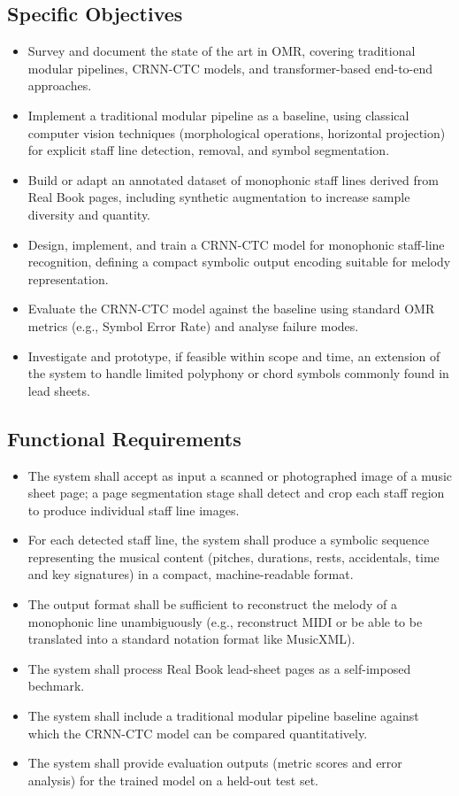 \documentclass[11pt, a4paper]{article}
\begin{document}
\subsection{Specific Objectives}
\begin{itemize}
    \item Survey and document the state of the art in OMR, covering traditional modular pipelines, CRNN-CTC models, and transformer-based end-to-end approaches.
    \item Implement a traditional modular pipeline as a baseline, using classical computer vision techniques (morphological operations, horizontal projection) for explicit staff line detection, removal, and symbol segmentation.
    \item Build or adapt an annotated dataset of monophonic staff lines derived from Real Book pages, including synthetic augmentation to increase sample diversity and quantity.
    \item Design, implement, and train a CRNN-CTC model for monophonic staff-line recognition, defining a compact symbolic output encoding suitable for melody representation.
    \item Evaluate the CRNN-CTC model against the baseline using standard OMR metrics (e.g., Symbol Error Rate) and analyse failure modes.
    \item Investigate and prototype, if feasible within scope and time, an extension of the system to handle limited polyphony or chord symbols commonly found in lead sheets.
\end{itemize}    

\subsection{Functional Requirements}
\begin{itemize}
    \item The system shall accept as input a scanned or photographed image of a music sheet page; a page segmentation stage shall detect and crop each staff region to produce individual staff line images.
    \item For each detected staff line, the system shall produce a symbolic sequence representing the musical content (pitches, durations, rests, accidentals, time and key signatures) in a compact, machine-readable format.
    \item The output format shall be sufficient to reconstruct the melody of a monophonic line unambiguously (e.g., reconstruct MIDI or be able to be translated into a standard notation format like MusicXML).
    \item The system shall process Real Book lead-sheet pages as a self-imposed bechmark.
    \item The system shall include a traditional modular pipeline baseline against which the CRNN-CTC model can be compared quantitatively.
    \item The system shall provide evaluation outputs (metric scores and error analysis) for the trained model on a held-out test set.
\end{itemize}
\end{document}
